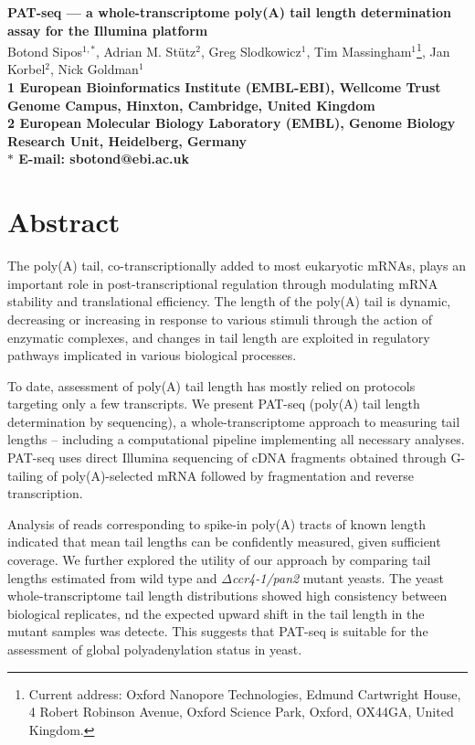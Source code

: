 \documentclass[10pt]{article}
\date{}
\begin{document}
\begin{flushleft}
{\Large
\textbf{PAT-seq --- a whole-transcriptome poly(A) tail length determination assay for the Illumina platform}
}
\\
Botond Sipos$^{1, \ast}$, 
Adrian M. St\"utz$^{2}$, 
Greg Slodkowicz$^{1}$,
Tim Massingham$^{1}$\footnote{Current address: Oxford Nanopore Technologies, Edmund Cartwright House, 4 Robert Robinson Avenue, Oxford Science Park, Oxford, OX44GA, United Kingdom.},
Jan Korbel$^{2}$, 
Nick Goldman$^{1}$
\\
\bf{1} European Bioinformatics Institute (EMBL-EBI), Wellcome Trust Genome Campus, Hinxton, Cambridge, United Kingdom
\\
\bf{2} European Molecular Biology Laboratory (EMBL), Genome Biology Research Unit, Heidelberg, Germany 
\\
$\ast$ E-mail: sbotond@ebi.ac.uk
\end{flushleft}

\section*{Abstract}

The poly(A) tail, co-transcriptionally added to most eukaryotic mRNAs, plays an important role in post-transcriptional regulation through modulating mRNA stability and translational efficiency. The length of the poly(A) tail is dynamic, decreasing or increasing in response to various stimuli through the action of enzymatic complexes, and changes in tail length are exploited in regulatory pathways implicated in various biological processes.

To date, assessment of poly(A) tail length has mostly relied on protocols targeting only a few transcripts. We present PAT-seq (poly(A) tail length determination by sequencing), a whole-transcriptome approach to measuring tail lengths  -- including a computational pipeline implementing all necessary analyses. PAT-seq uses direct Illumina sequencing of cDNA fragments obtained through G-tailing of poly(A)-selected mRNA followed by fragmentation and reverse transcription. 

Analysis of reads corresponding to spike-in poly(A) tracts of known length indicated that mean tail lengths can be confidently measured, given sufficient coverage. We further explored the utility of our approach by comparing tail lengths estimated from wild type and \textit{$\Delta$ccr4-1/pan2} mutant yeasts. The yeast whole-transcriptome tail length distributions showed high consistency between biological replicates, nd the expected upward shift in the tail length in the mutant samples was detecte. This suggests that PAT-seq is suitable for the assessment of global polyadenylation status in yeast.
\end{document}
